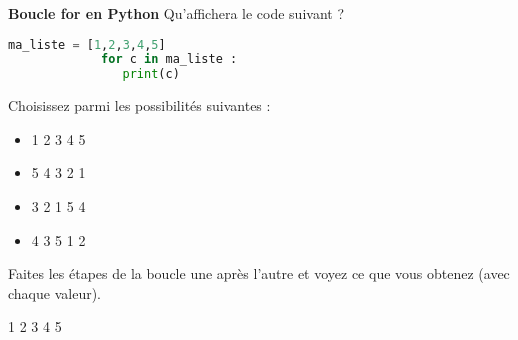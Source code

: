      	
    \begin{Exercice}[5 minutes] \textbf{Boucle for en Python}
      	Qu'affichera le code suivant ?
      	
      	\begin{lstlisting}[language=Python]
             ma_liste = [1,2,3,4,5]
             for c in ma_liste :
             	print(c) 
             	\end{lstlisting}
             	
        Choisissez parmi les possibilités suivantes :
        
        \begin{itemize}
        \item 1  
        2 
        3 
        4 
        5 
        \item 5 
        4 
        3 
        2 
        1 
        \item 3 
        2 
        1 
        5 
        4 
        \item 4 
        3 
        5 
        1 
        2
        \end{itemize}
    
        \begin{conseil}
		   Faites les étapes de la boucle une après l'autre et voyez ce que vous obtenez (avec chaque valeur).  
        \end{conseil}
        
        \begin{solution}
            1 
            2 
            3 
            4 
            5
        \end{solution}
    \end{Exercice}
    
